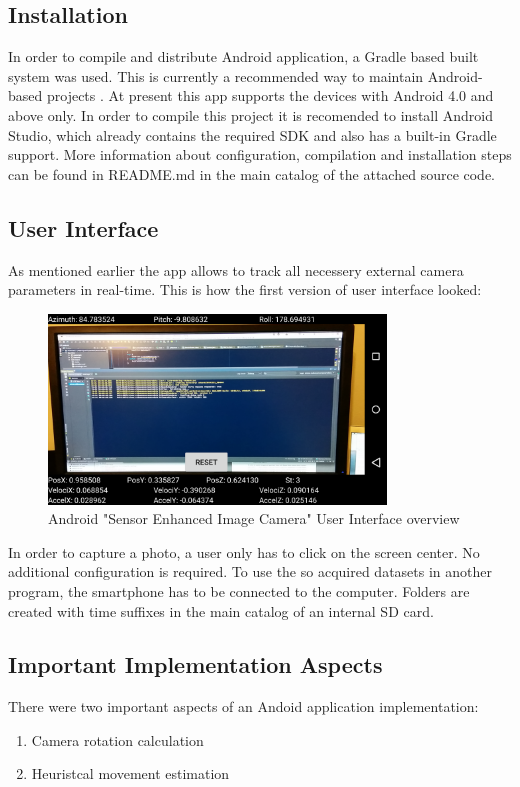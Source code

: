 \subsection{Installation}
In order to compile and distribute Android application, a Gradle based built system was used. This is currently a recommended way to maintain Android-based projects \cite{website:gradle}. At present this app supports the devices with Android 4.0 and above only. In order to compile this project it is recomended to install Android Studio, which already contains the required SDK and also has a built-in Gradle support. More information about configuration, compilation and installation steps can be found in README.md in the main catalog of the attached source code. 
\subsection{User Interface}
As mentioned earlier the app allows to track all necessery external camera parameters in real-time. This is how the first version of user interface looked:
\begin{figure}[h!]
    \centering
    \includegraphics[width=0.8\textwidth]{AndroidScreenShot}
    \caption{Android "Sensor Enhanced Image Camera" User Interface overview}
    \label{fig:AndroidScreenShot}
\end{figure}
\clearpage
In order to capture a photo, a user only has to click on the screen center. No additional configuration is required. To use the so acquired datasets in another program, the smartphone has to be connected to the computer. Folders are created with time suffixes in the main catalog of an internal SD card.
\subsection{Important Implementation Aspects}
There were two important aspects of an Andoid application implementation:
\begin{enumerate}
\item Camera rotation calculation
\item Heuristcal movement estimation
\end{enumerate}
